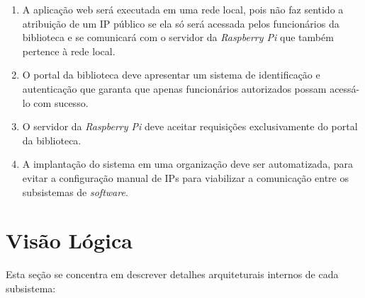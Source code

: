 \begin{enumerate}
    \item A aplicação web será executada em uma rede local, pois não faz sentido a atribuição de um IP público se ela só será acessada pelos funcionários da biblioteca e se comunicará com o servidor da \textit{Raspberry Pi} que também pertence à rede local.

    \item O portal da biblioteca deve apresentar um sistema de identificação e autenticação que garanta que apenas funcionários autorizados possam acessá-lo com sucesso.

    \item O servidor da \textit{Raspberry Pi} deve aceitar requisições exclusivamente do portal da biblioteca.

    \item A implantação do sistema em uma organização deve ser automatizada, para evitar a configuração manual de IPs para viabilizar a comunicação entre os subsistemas de \textit{software}.
\end{enumerate}

\section{Visão Lógica}
Esta seção se concentra em descrever detalhes arquiteturais internos de cada subsistema:

